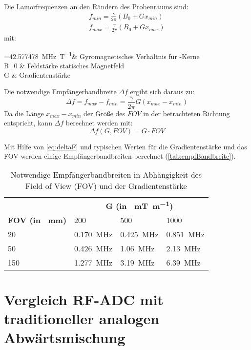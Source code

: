 Die Lamorfrequenzen an den Rändern des Probenraums sind:
\begin{subequations}
	\begin{align}
		f_{min}=\frac{\gamma}{2\pi} (B_0+G x_{min}) \\
		f_{max}=\frac{\gamma}{2\pi} (B_0+G x_{max})
	\end{align}
\end{subequations}
mit:
\begin{with}
	\frac{\gamma}{2\pi} =\SI{42.577478}{\mega\hertz\per\tesla}& Gyromagnetisches Verhältnis für -Kerne \\
	B_0  & Feldstärke statisches Magnetfeld \\
	G  & Gradientenstärke \\
\end{with}

Die notwendige Empfängerbandbreite $\Delta f$ ergibt sich daraus zu:
\begin{equation}
	\Delta f = f_{max}-f_{min} = \frac{\gamma}{2\pi} G (x_{max}-x_{min})
\end{equation}
Da die Länge $x_{max}-x_{min}$ der Größe des $FOV$ in der betrachteten Richtung entspricht, kann $\Delta f$ berechnet werden mit:
\begin{equation}
\label{eq:deltaF}
\Delta f(G, FOV) = G \cdot FOV
\end{equation}

Mit Hilfe von \autoref{eq:deltaF} und typischen Werten für die Gradientenstärke und das FOV werden einige Empfängerbandbreiten berechnet (\autoref{tab:empfBandbreite}).

\begin{table}[H]
	\centering
	\caption{Notwendige Empfängerbandbreiten in Abhängigkeit des Field of View (FOV) und der Gradientenstärke}
	\label{tab:empfBandbreite}
	\begin{tabular}{llll}
		\toprule
		  & \multicolumn{3}{c}{\textbf{G (in \SI{}{\milli\tesla\per\meter})}} \\ \cmidrule{2-4}
		  \textbf{FOV (in \SI{}{\mm})}& 200 & 500 & 1000 \\
		  20 & \SI{0.170}{\mega\hertz} & \SI{0.425}{\mega\hertz} & \SI{0.851}{\mega\hertz} \\
		  50 & \SI{0.426}{\mega\hertz} & \SI{1.06}{\mega\hertz} & \SI{2.13}{\mega\hertz} \\
		  150 & \SI{1.277}{\mega\hertz} & \SI{3.19}{\mega\hertz} & \SI{6.39}{\mega\hertz} \\
		\bottomrule
	\end{tabular}
\end{table}


\section{Vergleich RF-ADC mit traditioneller analogen Abwärtsmischung}





   
















